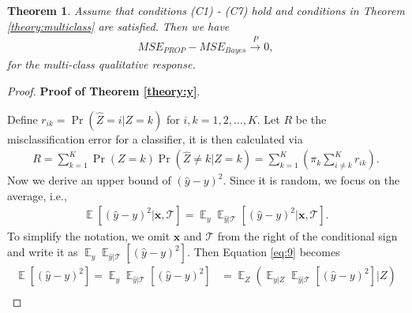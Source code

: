\documentclass[10pt,a4paper]{amsart}
\newtheorem{theorem}{Theorem}
\DeclareMathOperator{\E}{\mathbb{E}}
\begin{document}
\begin{theorem}{}{\label{theory:y}}
Assume that conditions (C1) - (C7) hold and conditions in Theorem \ref{theory:multiclass} are satisfied.
Then we have
\begin{align*}
MSE_{PROP} - MSE_{Bayes} \stackrel{P}{\rightarrow} 0,
\end{align*}
for the multi-class qualitative response.
\end{theorem}

\begin{proof}{\textbf{Proof of Theorem \ref{theory:y}}.}{}

Define $r_{ik}=\Pr(\hat{Z}=i|Z=k)$ for $i, k = 1, 2, \ldots, K$.
Let $R$ be the misclassification error for a classifier, it is then calculated via
\begin{align}\label{eq:R}
R = \sum_{k=1}^K \Pr(Z=k) \Pr(\hat{Z} \neq k|Z=k) = \sum_{k=1}^K \left( \pi_k \sum_{i \neq k}^K r_{ik} \right).
\end{align}
Now we derive an upper bound of $(\hat{y} - y)^2$.
Since it is random, we focus on the average, i.e.,
\begin{align}\label{eq:9}
\E[(\hat{y}-y)^2|\bm x, \mathcal{T}] = \E_y \E_{\hat{y}|\mathcal{T}} \left[(\hat{y}-y)^2|\bm x, \mathcal{T}\right].
\end{align}
To simplify the notation, we omit $\bm x$ and $\mathcal{T}$ from the right of the conditional sign and write it as $\E_y\E_{\hat{y}|\mathcal{T}}\left[(\hat{y}-y)^2\right]$.
Then Equation \eqref{eq:9} becomes
\begin{align*}
\E[(\hat{y}-y)^2] = \E_y \E_{\hat{y}|\mathcal{T}}\left[(\hat{y}-y)^2 \right] &= \E_Z (\E_{y|Z} \E_{\hat{y}|\mathcal{T}}\left[(\hat{y}-y)^2 \right] | Z) \\

\end{align*}
\end{proof}
\end{document}
